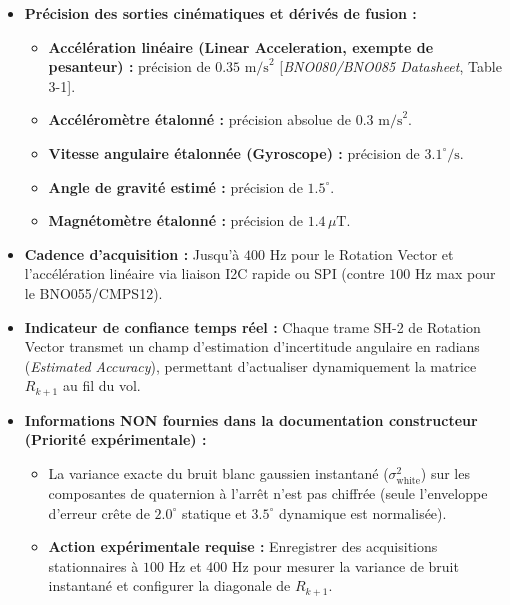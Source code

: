 \documentclass[../Formulations_Kalman.tex]{subfiles}
\begin{document}
\begin{itemize}
\begin{itemize}
    \end{itemize}
    \item \textbf{Précision des sorties cinématiques et dérivés de fusion :}
    \begin{itemize}
        \item \textbf{Accélération linéaire (Linear Acceleration, exempte de pesanteur) :} précision de $0.35\text{ m/s}^2$ [\textit{BNO080/BNO085 Datasheet}, Table 3-1].
        \item \textbf{Accéléromètre étalonné :} précision absolue de $0.3\text{ m/s}^2$.
        \item \textbf{Vitesse angulaire étalonnée (Gyroscope) :} précision de $3.1^\circ/\text{s}$.
        \item \textbf{Angle de gravité estimé :} précision de $1.5^\circ$.
        \item \textbf{Magnétomètre étalonné :} précision de $1.4\,\mu\text{T}$.
    \end{itemize}
    \item \textbf{Cadence d'acquisition :} Jusqu'à $400\text{ Hz}$ pour le Rotation Vector et l'accélération linéaire via liaison I2C rapide ou SPI (contre $100\text{ Hz}$ max pour le BNO055/CMPS12).
    \item \textbf{Indicateur de confiance temps réel :} Chaque trame SH-2 de Rotation Vector transmet un champ d'estimation d'incertitude angulaire en radians (\textit{Estimated Accuracy}), permettant d'actualiser dynamiquement la matrice $R_{k+1}$ au fil du vol.
    \item \textbf{Informations NON fournies dans la documentation constructeur (Priorité expérimentale) :}
    \begin{itemize}
        \item La variance exacte du bruit blanc gaussien instantané ($\sigma_{\text{white}}^2$) sur les composantes de quaternion à l'arrêt n'est pas chiffrée (seule l'enveloppe d'erreur crête de $2.0^\circ$ statique et $3.5^\circ$ dynamique est normalisée).
        \item \textbf{Action expérimentale requise :} Enregistrer des acquisitions stationnaires à $100\text{ Hz}$ et $400\text{ Hz}$ pour mesurer la variance de bruit instantané et configurer la diagonale de $R_{k+1}$.
    \end{itemize}
\end{itemize}
\end{document}
